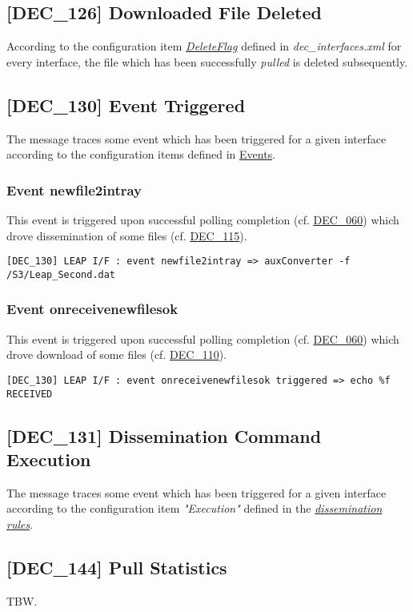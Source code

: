 \documentclass[dec_sum_main.tex]{subfiles}
\begin{document}
\label{DEC126}
\subsection{[DEC\_126] Downloaded File Deleted}
According to the configuration item \hyperref[DeleteFlag]{\textit{DeleteFlag}} defined in \textit{dec\_interfaces.xml} for every interface, the file which has been successfully \textit{pulled} is deleted subsequently.

\subsection{[DEC\_130] Event Triggered}
The message traces some event which has been triggered for a given interface according to the configuration items defined in \hyperref[Events]{Events}.

\subsubsection{Event newfile2intray}
This event is triggered upon successful polling completion (cf. \hyperref[DEC060]{DEC\_060}) which drove dissemination of some files (cf. \hyperref[DEC115]{DEC\_115}).
\begin{verbatim}
[DEC_130] LEAP I/F : event newfile2intray => auxConverter -f /S3/Leap_Second.dat
\end{verbatim}

\subsubsection{Event onreceivenewfilesok}
This event is triggered upon successful polling completion (cf. \hyperref[DEC060]{DEC\_060}) which drove download of some files (cf. \hyperref[DEC110]{DEC\_110}).
\begin{verbatim}
[DEC_130] LEAP I/F : event onreceivenewfilesok triggered => echo %f RECEIVED
\end{verbatim}

\subsection{[DEC\_131] Dissemination Command Execution }
The message traces some event which has been triggered for a given interface according to the configuration item \textit{"Execution"} defined in the \hyperref[Dissemination rules]{\textit{dissemination rules}}.

\label{DEC144}
\subsection{[DEC\_144] Pull Statistics}
TBW.
\end{document}
